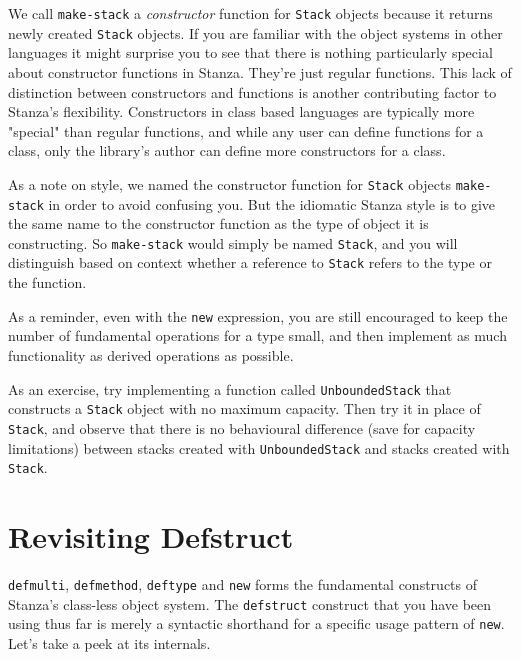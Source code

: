 \documentclass[10pt,oneside]{book}
\begin{document}
We call \texttt{\frenchspacing make-stack} a {\em constructor} function for \texttt{\frenchspacing Stack} objects because it returns newly created \texttt{\frenchspacing Stack} objects. If you are familiar with the object systems in other languages it might surprise you to see that there is nothing particularly special about constructor functions in Stanza. They're just regular functions. This lack of distinction between constructors and functions is another contributing factor to Stanza's flexibility. Constructors in class based languages are typically more "special" than regular functions, and while any user can define functions for a class, only the library's author can define more constructors for a class.

As a note on style, we named the constructor function for \texttt{\frenchspacing Stack} objects \texttt{\frenchspacing make-stack} in order to avoid confusing you. But the idiomatic Stanza style is to give the same name to the constructor function as the type of object it is constructing. So \texttt{\frenchspacing make-stack} would simply be named \texttt{\frenchspacing Stack}, and you will distinguish based on context whether a reference to \texttt{\frenchspacing Stack} refers to the type or the function.

As a reminder, even with the \texttt{\frenchspacing new} expression, you are still encouraged to keep the number of fundamental operations for a type small, and then implement as much functionality as derived operations as possible.

As an exercise, try implementing a function called \texttt{\frenchspacing UnboundedStack} that constructs a \texttt{\frenchspacing Stack} object with no maximum capacity. Then try it in place of \texttt{\frenchspacing Stack}, and observe that there is no behavioural difference (save for capacity limitations) between stacks created with \texttt{\frenchspacing UnboundedStack} and stacks created with \texttt{\frenchspacing Stack}. 

\section{Revisiting Defstruct}
\texttt{\frenchspacing defmulti}, \texttt{\frenchspacing defmethod}, \texttt{\frenchspacing deftype} and \texttt{\frenchspacing new} forms the fundamental constructs of Stanza's class-less object system. The \texttt{\frenchspacing defstruct} construct that you have been using thus far is merely a syntactic shorthand for a specific usage pattern of \texttt{\frenchspacing new}. Let's take a peek at its internals.
\end{document}
